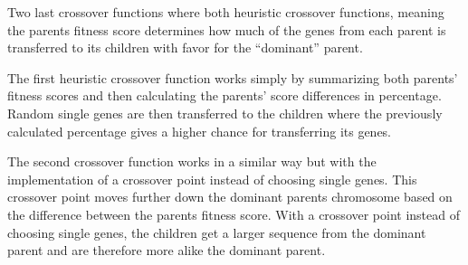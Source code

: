 Two last crossover functions where both heuristic crossover functions, meaning the parents fitness score determines how much of the genes from each parent is transferred to its children with favor for the “dominant” parent.

\begin{par}
	The first heuristic crossover function works simply by summarizing both parents' fitness scores and then calculating the parents' score differences in percentage. Random single genes are then transferred to the children where the previously calculated percentage gives a higher chance for transferring its genes.

	\label{par:swap single genes}
\end{par}

\begin{par}
	The second crossover function works in a similar way but with the implementation of a crossover point instead of choosing single genes. This crossover point moves further down the dominant parents chromosome based on the difference between the parents fitness score. With a crossover point instead of choosing single genes, the children get a larger sequence from the dominant parent and are therefore more alike the dominant parent.
	\label{par:swap sequnce of genes}
\end{par}
